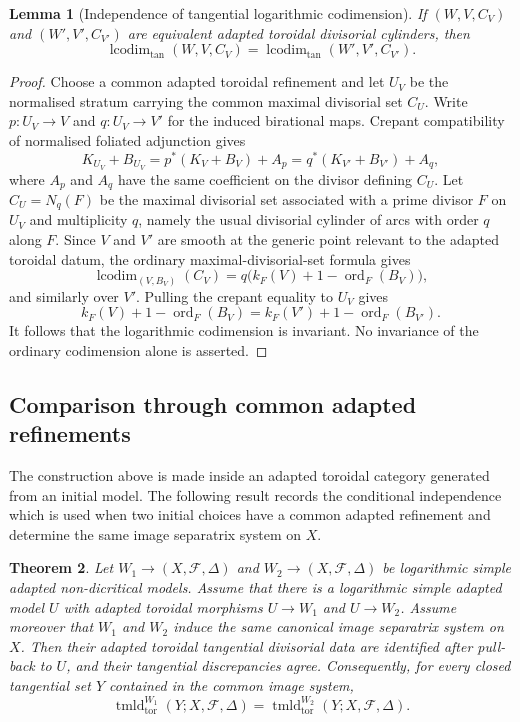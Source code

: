 \documentclass[11pt]{amsart}
\numberwithin{equation}{section}
\theoremstyle{plain}
\newtheorem{Theorem}{Theorem}[section]
\newtheorem{Lemma}[Theorem]{Lemma}
\theoremstyle{definition}
\newcommand{\ord}{\operatorname{ord}}
\newcommand{\lcodim}{\operatorname{lcodim}}
\newcommand{\tmld}{\operatorname{tmld}}
\newcommand{\cF}{\mathcal F}
\begin{document}
\begin{Lemma}[Independence of tangential logarithmic codimension]
\label{lem:codim-independence}
If $(W,V,C_V)$ and $(W',V',C_{V'})$ are equivalent adapted toroidal divisorial cylinders, then
\[
\lcodim_{\tan}(W,V,C_V)=\lcodim_{\tan}(W',V',C_{V'}).
\]
\end{Lemma}
\begin{proof}
Choose a common adapted toroidal refinement and let $U_V$ be the normalised stratum carrying the common maximal divisorial set $C_U$.  Write \(p:U_V\to V\) and \(q:U_V\to V'\) for the induced birational maps.  Crepant compatibility of normalised foliated adjunction gives
\[
K_{U_V}+B_{U_V}=p^*(K_V+B_V)+A_p=q^*(K_{V'}+B_{V'})+A_q,
\]
where $A_p$ and $A_q$ have the same coefficient on the divisor defining $C_U$.
Let $C_U=N_q(F)$ be the maximal divisorial set associated with a prime divisor
$F$ on $U_V$ and multiplicity $q$, namely the usual divisorial cylinder of arcs
with order $q$ along $F$. Since $V$ and $V'$ are smooth at the generic point
relevant to the adapted toroidal datum, the ordinary maximal-divisorial-set
formula gives
\[
\lcodim_{(V,B_V)}(C_V)=q\bigl(k_F(V)+1-\ord_F(B_V)\bigr),
\]
and similarly over $V'$.  Pulling the crepant equality to $U_V$ gives
\[
k_F(V)+1-\ord_F(B_V)=k_F(V')+1-\ord_F(B_{V'}).
\]
It follows that the logarithmic codimension is invariant.  No invariance of the ordinary codimension alone is asserted.
\end{proof}

\subsection{Comparison through common adapted refinements}
\label{subsec:common-refinement}

The construction above is made inside an adapted toroidal category generated
from an initial model.  The following result records the conditional
independence which is used when two initial choices have a common adapted
refinement and determine the same image separatrix system on $X$.

\begin{Theorem} 
\label{thm:common-refinement-invariance}
Let $W_1\to (X,\cF,\Delta)$ and $W_2\to (X,\cF,\Delta)$ be logarithmic
simple adapted non-dicritical models.  Assume that there is a logarithmic
simple adapted model $U$ with adapted toroidal morphisms $U\to W_1$ and
$U\to W_2$.  Assume moreover that $W_1$ and $W_2$ induce the same canonical
image separatrix system on $X$.  Then their adapted toroidal tangential
divisorial data are identified after pull-back to $U$, and their tangential
discrepancies agree.  Consequently, for every closed tangential set $Y$
contained in the common image system,
\[
\tmld_{\mathrm{tor}}^{W_1}(Y;X,\cF,\Delta)
=
\tmld_{\mathrm{tor}}^{W_2}(Y;X,\cF,\Delta).
\]
\end{Theorem}
\end{document}
